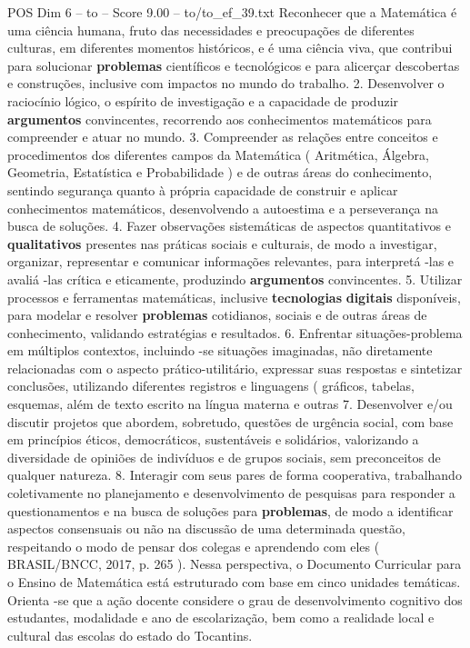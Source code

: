 \begin{textsample}{POS Dim 6 – to – Score 9.00 – to/to\_ef\_39.txt}
Reconhecer que a Matemática é uma ciência humana, fruto das necessidades e preocupações de diferentes culturas, em diferentes momentos históricos, e é uma ciência viva, que contribui para solucionar \textbf{problemas} científicos e tecnológicos e para alicerçar descobertas e construções, inclusive com impactos no mundo do trabalho. 2.
Desenvolver o raciocínio lógico, o espírito de investigação e a capacidade de produzir \textbf{argumentos} convincentes, recorrendo aos conhecimentos matemáticos para compreender e atuar no mundo. 3.
Compreender as relações entre conceitos e procedimentos dos diferentes campos da Matemática ( Aritmética, Álgebra, Geometria, Estatística e Probabilidade ) e de outras áreas do conhecimento, sentindo segurança quanto à própria capacidade de construir e aplicar conhecimentos matemáticos, desenvolvendo a autoestima e a perseverança na busca de soluções. 4.
Fazer observações sistemáticas de aspectos quantitativos e \textbf{qualitativos} presentes nas práticas sociais e culturais, de modo a investigar, organizar, representar e comunicar informações relevantes, para interpretá -las e avaliá -las crítica e eticamente, produzindo \textbf{argumentos} convincentes. 5.
Utilizar processos e ferramentas matemáticas, inclusive \textbf{tecnologias} \textbf{digitais} disponíveis, para modelar e resolver \textbf{problemas} cotidianos, sociais e de outras áreas de conhecimento, validando estratégias e resultados. 6.
Enfrentar situações-problema em múltiplos contextos, incluindo -se situações imaginadas, não diretamente relacionadas com o aspecto prático-utilitário, expressar suas respostas e sintetizar conclusões, utilizando diferentes registros e linguagens ( gráficos, tabelas, esquemas, além de texto escrito na língua materna e outras 7.
Desenvolver e/ou discutir projetos que abordem, sobretudo, questões de urgência social, com base em princípios éticos, democráticos, sustentáveis e solidários, valorizando a diversidade de opiniões de indivíduos e de grupos sociais, sem preconceitos de qualquer natureza. 8.
Interagir com seus pares de forma cooperativa, trabalhando coletivamente no planejamento e desenvolvimento de pesquisas para responder a questionamentos e na busca de soluções para \textbf{problemas}, de modo a identificar aspectos consensuais ou não na discussão de uma determinada questão, respeitando o modo de pensar dos colegas e aprendendo com eles ( BRASIL/BNCC, 2017, p. 265 ).
Nessa perspectiva, o Documento Curricular para o Ensino de Matemática está estruturado com base em cinco unidades temáticas.
Orienta -se que a ação docente considere o grau de desenvolvimento cognitivo dos estudantes, modalidade e ano de escolarização, bem como a realidade local e cultural das escolas do estado do Tocantins.

\end{textsample}
